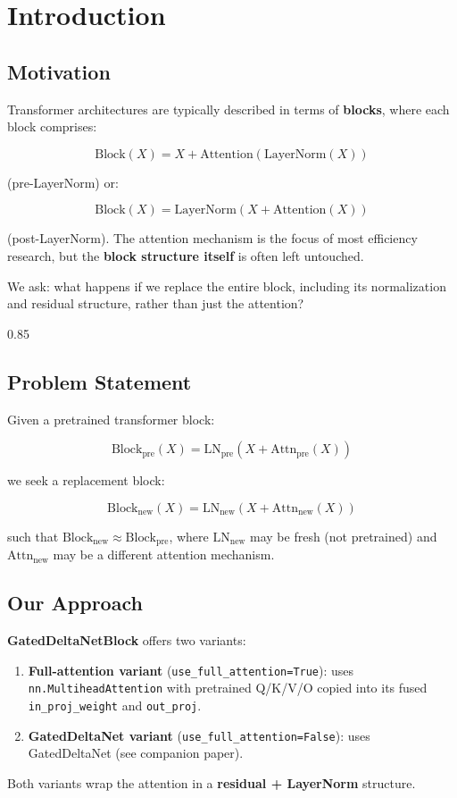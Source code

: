 
\section{Introduction}

\subsection{Motivation}

Transformer architectures are typically described in terms of \textbf{blocks}, 
where each block comprises:

\[
\text{Block}(X) = X + \text{Attention}(\text{LayerNorm}(X))
\tag{1.1}
\]

(pre-LayerNorm) or:

\[
\text{Block}(X) = \text{LayerNorm}(X + \text{Attention}(X))
\tag{1.2}
\]

(post-LayerNorm). The attention mechanism is the focus of most efficiency 
research, but the \textbf{block structure itself} is often left untouched.

We ask: what happens if we replace the entire block, including its 
normalization and residual structure, rather than just the attention?

0.85


\subsection{Problem Statement}

Given a pretrained transformer block:

\[
\text{Block}_\text{pre}(X) = \text{LN}_\text{pre}(X + \text{Attn}_\text{pre}(X))
\tag{1.3}
\]

we seek a replacement block:

\[
\text{Block}_\text{new}(X) = \text{LN}_\text{new}(X + \text{Attn}_\text{new}(X))
\tag{1.4}
\]

such that $\text{Block}_\text{new} \approx \text{Block}_\text{pre}$, where 
$\text{LN}_\text{new}$ may be fresh (not pretrained) and $\text{Attn}_\text{new}$ 
may be a different attention mechanism.

\subsection{Our Approach}

\textbf{GatedDeltaNetBlock} offers two variants:

\begin{enumerate}
\item \textbf{Full-attention variant} (\texttt{use\_full\_attention=True}): uses
  \texttt{nn.MultiheadAttention} with pretrained Q/K/V/O copied into its fused
  \texttt{in\_proj\_weight} and \texttt{out\_proj}.

\item \textbf{GatedDeltaNet variant} (\texttt{use\_full\_attention=False}): uses GatedDeltaNet
  (see companion paper).

\end{enumerate}
Both variants wrap the attention in a \textbf{residual + LayerNorm} structure.

